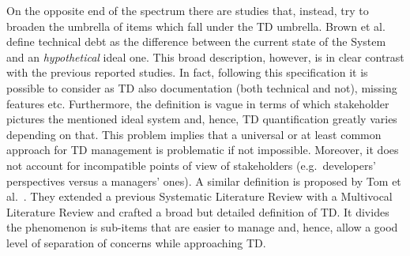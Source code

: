 On the opposite end of the spectrum there are studies that, instead, try to broaden the umbrella of items which fall under the TD umbrella. Brown et al.\ \cite{td_current_vs_optimal_quality} define technical debt as the difference between the current state of the System and an \textit{hypothetical} ideal one. This broad description, however, is in clear contrast with the previous reported studies. In fact, following this specification it is possible to consider as TD also documentation (both technical and not), missing features etc. Furthermore, the definition is vague in terms of which stakeholder pictures the mentioned ideal system and, hence, TD quantification greatly varies depending on that. This problem implies that a universal or at least common approach for TD management is problematic if not impossible. Moreover, it does not account for incompatible points of view of stakeholders (e.g.\ developers' perspectives versus a managers' ones). A similar definition is proposed by Tom et al.\ \cite{exploration_of_td}. They extended a previous Systematic Literature Review \cite{slr,exploration_of_td_2} with a Multivocal Literature Review \cite{multivocal_literature_review} and crafted a broad but detailed definition of TD. It divides the phenomenon is sub-items that are easier to manage and, hence, allow a good level of separation of concerns while approaching TD. 
